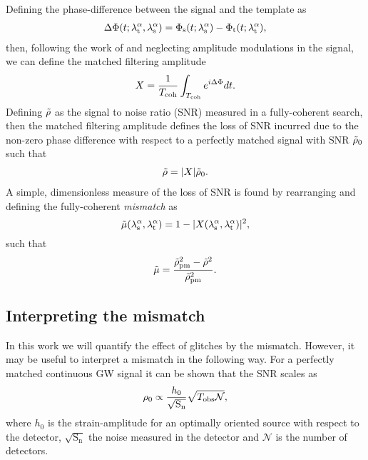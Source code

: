 \documentclass[../full_thesis/full_thesis.tex]{subfiles}
\begin{document}
Defining the phase-difference between the signal and the template as
\begin{align}
\Delta\Phi(t; {\lambda}_\textrm{t}^{\alpha}, {\lambda}_\textrm{s}^{\alpha}) = \Phi_{\textrm{s}}(t; {\lambda}_\textrm{s}^{\alpha}) - \Phi_{\textrm{t}}(t; {\lambda}_\textrm{t}^{\alpha}),
\label{eqn: phase diff}
\end{align}
then, following the work of \citet{Prix2005} and neglecting amplitude modulations
in the signal, we can define the matched filtering amplitude
\begin{equation}
X = \frac{1}{T_{\mathrm{coh}}}\int_{T_{\mathrm{coh}}}e^{i\Delta\Phi} dt.
\label{eqn: matched filtering amplitude}
\end{equation}
Defining $\tilde{\rho}$ as the signal to noise ratio (SNR) measured in a fully-coherent
search, then the matched filtering amplitude defines the loss of SNR incurred
due to the non-zero phase difference with respect to a perfectly matched signal
with SNR $\tilde{\rho}_{0}$ such that
\begin{align}
\tilde{\rho} = |X|\tilde{\rho}_{0}.
\end{align}
A simple, dimensionless measure of the loss of SNR is found by rearranging
and defining the fully-coherent \emph{mismatch} as
\begin{equation}
\tilde{\mu}({\lambda}_\textrm{s}^{\alpha}, {\lambda}_\textrm{t}^{\alpha}) = 1 - |X({\lambda}_\textrm{s}^{\alpha}, {\lambda}_\textrm{t}^{\alpha})|^{2},
\label{eqn: full mismatch}
\end{equation}
such that
\begin{equation}
\tilde{\mu} = \frac{\tilde{\rho}_{\mathrm{pm}}^{2} - \tilde{\rho}^{2}}
                {\tilde{\rho}^{2}_{\mathrm{pm}}}.
\label{eqn: numeric mismatch}
\end{equation}

\subsection{Interpreting the mismatch}
In this work we will quantify the effect of glitches by the mismatch. However,
it may be useful to interpret a mismatch in the following way. For a perfectly
matched continuous GW signal it can be shown \citep{Jaranowski1998} that the SNR scales as
\begin{equation}
\rho_{0} \propto \frac{h_{0}}{\sqrt{\textrm{S}_{\textrm{n}}}}
                               \sqrt{T_{\mathrm{obs}} \mathcal{N}},
\end{equation}
where $h_{0}$ is the strain-amplitude for an optimally oriented source with
respect to the detector, $\sqrt{\textrm{S}_{\textrm{n}}}$ the noise measured
in the detector and $\mathcal{N}$ is the number of detectors.
\end{document}
